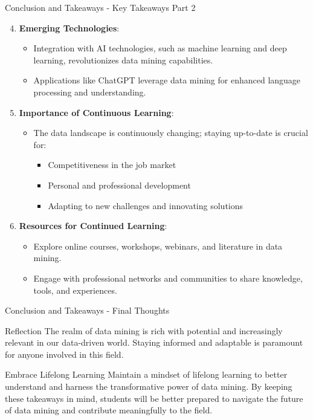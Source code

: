 \documentclass[aspectratio=169]{beamer}
\begin{document}
\begin{frame}[fragile]{Conclusion and Takeaways - Key Takeaways Part 2}
    \begin{enumerate}
        \setcounter{enumi}{3} %
        \item \textbf{Emerging Technologies}:
            \begin{itemize}
                \item Integration with AI technologies, such as machine learning and deep learning, revolutionizes data mining capabilities.
                \item Applications like ChatGPT leverage data mining for enhanced language processing and understanding.
            \end{itemize}

        \item \textbf{Importance of Continuous Learning}:
            \begin{itemize}
                \item The data landscape is continuously changing; staying up-to-date is crucial for:
                    \begin{itemize}
                        \item Competitiveness in the job market
                        \item Personal and professional development
                        \item Adapting to new challenges and innovating solutions
                    \end{itemize}
            \end{itemize}

        \item \textbf{Resources for Continued Learning}:
            \begin{itemize}
                \item Explore online courses, workshops, webinars, and literature in data mining.
                \item Engage with professional networks and communities to share knowledge, tools, and experiences.
            \end{itemize}
    \end{enumerate}
\end{frame}

\begin{frame}[fragile]{Conclusion and Takeaways - Final Thoughts}
    \begin{block}{Reflection}
        The realm of data mining is rich with potential and increasingly relevant in our data-driven world. Staying informed and adaptable is paramount for anyone involved in this field.
    \end{block}
    
    \begin{block}{Embrace Lifelong Learning}
        Maintain a mindset of lifelong learning to better understand and harness the transformative power of data mining. By keeping these takeaways in mind, students will be better prepared to navigate the future of data mining and contribute meaningfully to the field.
    \end{block}
\end{frame}
\end{document}
